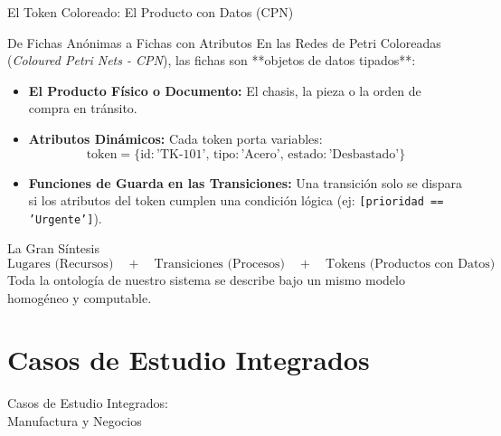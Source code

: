 \documentclass[10pt, aspectratio=169]{beamer}
\begin{document}
\begin{frame}{El Token Coloreado: El Producto con Datos (CPN)}
	\begin{block}{De Fichas Anónimas a Fichas con Atributos}
		En las Redes de Petri Coloreadas (\emph{Coloured Petri Nets - CPN}), las fichas son **objetos de datos tipados**:
		\begin{itemize}
			\item \textbf{El Producto Físico o Documento:} El chasis, la pieza o la orden de compra en tránsito.
			\item \textbf{Atributos Dinámicos:} Cada token porta variables:
			\[ \text{token} = \{ \text{id}: \text{'TK-101'}, \, \text{tipo}: \text{'Acero'}, \, \text{estado}: \text{'Desbastado'} \} \]
			\item \textbf{Funciones de Guarda en las Transiciones:} Una transición solo se dispara si los atributos del token cumplen una condición lógica (ej: \texttt{[prioridad == 'Urgente']}).
		\end{itemize}
	\end{block}

	\begin{alertblock}{La Gran Síntesis}
		$$\text{Lugares (Recursos)} \quad + \quad \text{Transiciones (Procesos)} \quad + \quad \text{Tokens (Productos con Datos)}$$
		Toda la ontología de nuestro sistema se describe bajo un mismo modelo homogéneo y computable.
	\end{alertblock}
\end{frame}

\section{Casos de Estudio Integrados}

\begin{frame}{}
	\centering
	\Huge{Casos de Estudio Integrados: \\ Manufactura y Negocios}
\end{frame}
\end{document}
